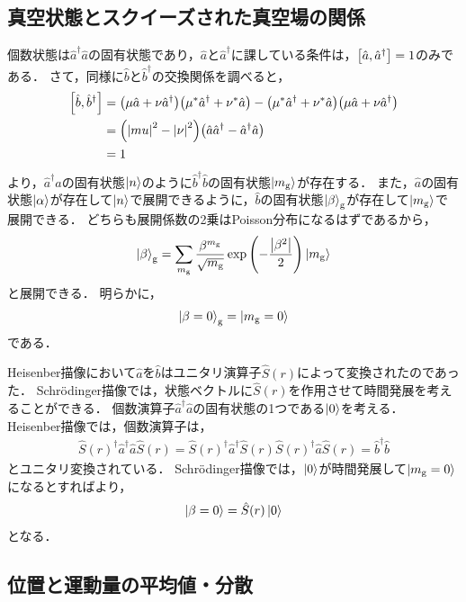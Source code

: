 \documentclass{report}
\begin{document}
  \subsection{真空状態とスクイーズされた真空場の関係}
    個数状態は$\hat{a}^{\dag}\hat{a}$の固有状態であり，$\hat{a}$と$\hat{a}^{\dag}$に課している条件は，$\qty[\hat{a}, \hat{a}^{\dag}] = 1$のみである．
    さて，同様に$\hat{b}$と$\hat{b}^{\dag}$の交換関係を調べると，
    \begin{align}
      \qty[\hat{b}, \hat{b}^{\dag}] &= \qty(\mu\hat{a} + \nu\hat{a}^{\dag})\qty(\mu^*\hat{a}^{\dag} + \nu^*\hat{a}) - \qty(\mu^*\hat{a}^{\dag} + \nu^*\hat{a})\qty(\mu\hat{a} + \nu\hat{a}^{\dag}) \\ 
      &= \qty(\abs{mu}^2 - \abs{\nu}^2)\qty(\hat{a}\hat{a}^{\dag} - \hat{a}^{\dag}\hat{a}) \\ 
      &= 1
    \end{align}
    より，$\hat{a}^{\dag}\hat{a}$の固有状態$\ket{n}$のように$\hat{b}^{\dag}\hat{b}$の固有状態$\ket{m_{\mathrm{g}}}$が存在する．
    また，$\hat{a}$の固有状態$\ket{\alpha}$が存在して$\ket{n}$で展開できるように，$\hat{b}$の固有状態$\ket{\beta}_{\mathrm{g}}$が存在して$\ket{m_{\mathrm{g}}}$で展開できる．
    どちらも展開係数の2乗はPoisson分布になるはずであるから，
    \begin{align}
      \ket{\beta}_{\mathrm{g}} = \sum_{m_{\mathrm{g}}}\frac{\beta^{m_{\mathrm{g}}}}{\sqrt{m_{\mathrm{g}}}}\exp\qty(-\frac{\abs{\beta^2}}{2})\ket{m_{\mathrm{g}}}
    \end{align}
    と展開できる．
    明らかに，
    \begin{align}
      \ket{\beta = 0}_{\mathrm{g}} = \ket{m_{\mathrm{g}} = 0}\label{bg-mg-relation}
    \end{align}
    である．
    \par
    Heisenber描像において$\hat{a}$を$\hat{b}$はユニタリ演算子$\hat{S}(r)$によって変換されたのであった．
    Schr\"odinger描像では，状態ベクトルに$\hat{S}(r)$を作用させて時間発展を考えることができる．
    個数演算子$\hat{a}^{\dag}\hat{a}$の固有状態の1つである$\ket{0}$を考える．
    Heisenber描像では，個数演算子は，
    \begin{align}
      \hat{S}(r)^{\dag}\hat{a}^{\dag}\hat{a}\hat{S}(r) = \hat{S}(r)^{\dag}\hat{a}^{\dag}\hat{S}(r)\hat{S}(r)^{\dag}\hat{a}\hat{S}(r) = \hat{b}^{\dag}\hat{b}
    \end{align}
    とユニタリ変換されている．
    Schr\"odinger描像では，$\ket{0}$が時間発展して$\ket{m_{\mathrm{g}} = 0}$になるとすればより，
    \begin{align}
      \ket{\beta = 0} = \hat{S}(r)\ket{0}
    \end{align}
    となる．
  \subsection{位置と運動量の平均値・分散}
\end{document}
